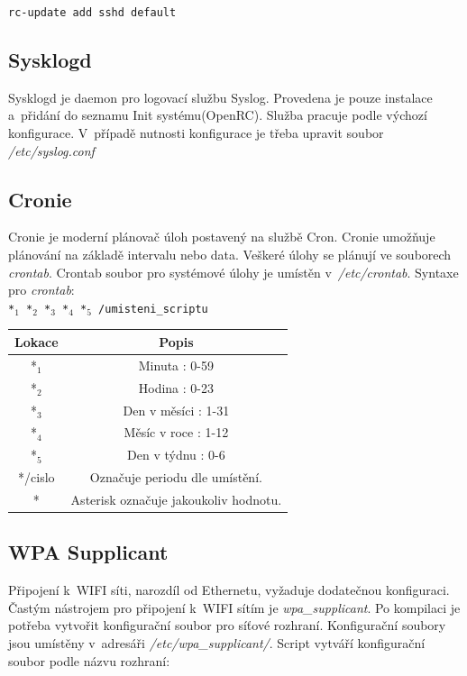 \documentclass[12pt,a4paper,twoside,]{article}
\begin{document}
{{{{{{\texttt{rc-update add sshd default}
\subsection{\textsf{Sysklogd}} 
Sysklogd je daemon pro logovací službu Syslog. Provedena je pouze instalace a~přidání do seznamu Init systému(OpenRC). Služba pracuje podle výchozí konfigurace. V~případě nutnosti konfigurace je třeba upravit soubor \textit{/etc/syslog.conf}

\subsection{\textsf{Cronie}}

Cronie je moderní plánovač úloh postavený na službě Cron. Cronie umožňuje plánování na základě intervalu nebo data. Veškeré úlohy se plánují ve souborech \textit{crontab}. Crontab soubor pro systémové úlohy je umístěn v~\textit{/etc/crontab}. Syntaxe pro \textit{crontab}:\\

\texttt{*$_{1}$ *$_{2}$ *$_{3}$ *$_{4}$ *$_{5}$ /umisteni\_scriptu}

\begin{table}[h]
	\centering
	\begin{tabular}{|c|c|}
		\hline 
		Lokace&Popis \\
		\hline
		*$_{1}$&  Minuta : 0-59 \\
		\hline
		*$_{2}$&  Hodina : 0-23 \\
		\hline
		*$_{3}$&  Den v měsíci : 1-31 \\
		\hline
		*$_{4}$&  Měsíc v roce : 1-12 \\
		\hline
		*$_{5}$&  Den v týdnu : 0-6 \\
		\hline
		*/cislo&  Označuje periodu dle umístění. \\
		\hline
		*&  Asterisk označuje jakoukoliv hodnotu. \\
		\hline
	\end{tabular}

\end{table}
\subsection{\textsf{WPA Supplicant}}
Připojení k~WIFI síti, narozdíl od Ethernetu, vyžaduje dodatečnou konfiguraci. Častým nástrojem pro připojení k~WIFI sítím je \textit{wpa\_supplicant}. Po kompilaci je potřeba vytvořit konfigurační soubor pro síťové rozhraní. Konfigurační soubory jsou umístěny v~adresáři \textit{/etc/wpa\_supplicant/}. Script vytváří konfigurační soubor podle názvu rozhraní:\\

}}}}}}
\end{document}
